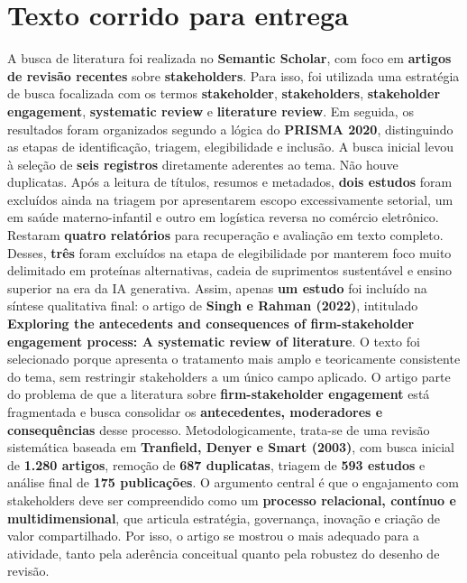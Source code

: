 \documentclass[12pt]{article}
\begin{document}
\section{Texto corrido para entrega}
\label{sec:org98b1cc2}

A busca de literatura foi realizada no \textbf{Semantic Scholar}, com foco em \textbf{artigos de revisão recentes} sobre \textbf{stakeholders}. Para isso, foi utilizada uma estratégia de busca focalizada com os termos \textbf{stakeholder}, \textbf{stakeholders}, \textbf{stakeholder engagement}, \textbf{systematic review} e \textbf{literature review}. Em seguida, os resultados foram organizados segundo a lógica do \textbf{PRISMA 2020}, distinguindo as etapas de identificação, triagem, elegibilidade e inclusão. A busca inicial levou à seleção de \textbf{seis registros} diretamente aderentes ao tema. Não houve duplicatas. Após a leitura de títulos, resumos e metadados, \textbf{dois estudos} foram excluídos ainda na triagem por apresentarem escopo excessivamente setorial, um em saúde materno-infantil e outro em logística reversa no comércio eletrônico. Restaram \textbf{quatro relatórios} para recuperação e avaliação em texto completo. Desses, \textbf{três} foram excluídos na etapa de elegibilidade por manterem foco muito delimitado em proteínas alternativas, cadeia de suprimentos sustentável e ensino superior na era da IA generativa. Assim, apenas \textbf{um estudo} foi incluído na síntese qualitativa final: o artigo de \textbf{Singh e Rahman (2022)}, intitulado \textbf{Exploring the antecedents and consequences of firm-stakeholder engagement process: A systematic review of literature}. O texto foi selecionado porque apresenta o tratamento mais amplo e teoricamente consistente do tema, sem restringir stakeholders a um único campo aplicado. O artigo parte do problema de que a literatura sobre \textbf{firm-stakeholder engagement} está fragmentada e busca consolidar os \textbf{antecedentes, moderadores e consequências} desse processo. Metodologicamente, trata-se de uma revisão sistemática baseada em \textbf{Tranfield, Denyer e Smart (2003)}, com busca inicial de \textbf{1.280 artigos}, remoção de \textbf{687 duplicatas}, triagem de \textbf{593 estudos} e análise final de \textbf{175 publicações}. O argumento central é que o engajamento com stakeholders deve ser compreendido como um \textbf{processo relacional, contínuo e multidimensional}, que articula estratégia, governança, inovação e criação de valor compartilhado. Por isso, o artigo se mostrou o mais adequado para a atividade, tanto pela aderência conceitual quanto pela robustez do desenho de revisão.
\end{document}
